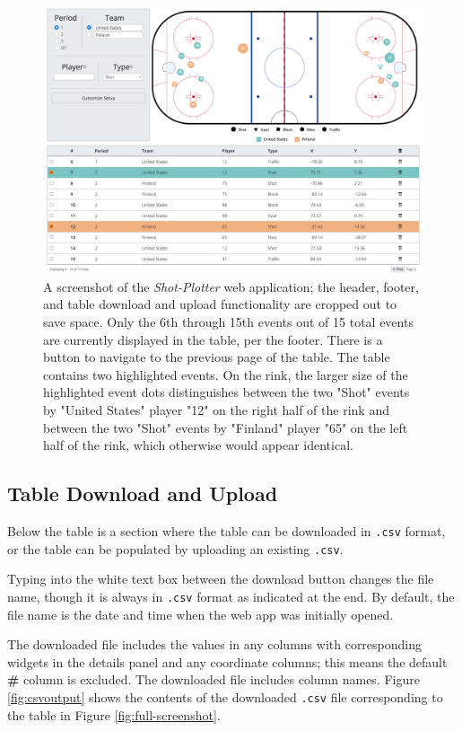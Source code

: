 \documentclass[letterpaper]{article}
\begin{document}
\begin{figure}[h!]
	\centering
	\includegraphics[width=1\linewidth]{images/highlighting}
	\caption{A screenshot of the \textit{Shot-Plotter} web application; the header, footer, and table download and upload functionality are cropped out to save space. Only the 6th through 15th events out of 15 total events are currently displayed in the table, per the footer. There is a button to navigate to the previous page of the table. The table contains two highlighted events. On the rink, the larger size of the highlighted event dots distinguishes between the two "Shot" events by "United States" player "12" on the right half of the rink and between the two "Shot" events by "Finland" player "65" on the left half of the rink, which otherwise would appear identical.}
		\label{fig:highlighting}
\end{figure}

\subsection{Table Download and Upload}\label{table-up-down}
Below the table is a section where the table can be downloaded in \texttt{.csv} format, or the table can be populated by uploading an existing \texttt{.csv}.

Typing into the white text box between the download button changes the file name, though it is always in \texttt{.csv} format as indicated at the end. By default, the file name is the date and time when the web app was initially opened.

The downloaded file includes the values in any columns with corresponding widgets in the details panel and any coordinate columns; this means the default \textbf{\#} column is excluded. The downloaded file includes column names. Figure \ref{fig:csvoutput} shows the contents of the downloaded \texttt{.csv} file corresponding to the table in Figure \ref{fig:full-screenshot}.
\end{document}
